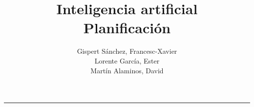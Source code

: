 \documentclass[a4paper,12pt,spanish]{article}
\begin{document}
\title{
    {\huge Inteligencia artificial}\\ 
    Planificación
}

\author{
    Gispert Sánchez, Francesc-Xavier\\
    Lorente García, Ester\\
    Martín Alaminos, David
}

\maketitle

\noindent \rule[0.5ex]{1\columnwidth}{1pt}

\tableofcontents

\clearpage












\end{document}

